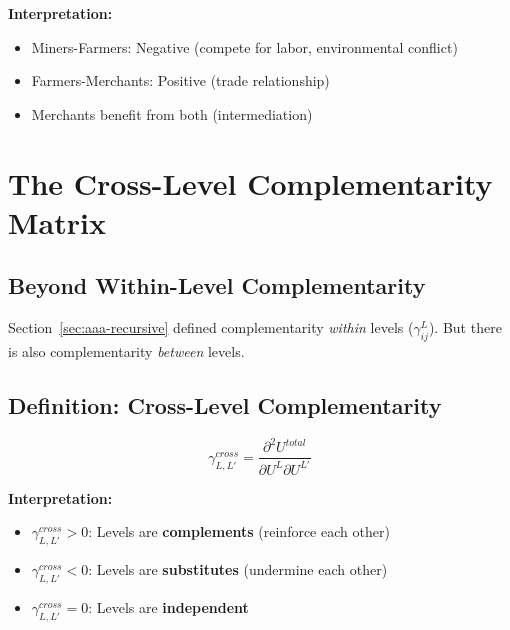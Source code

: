 \textbf{Interpretation:}
\begin{itemize}
\item Miners-Farmers: Negative (compete for labor, environmental conflict)
\item Farmers-Merchants: Positive (trade relationship)
\item Merchants benefit from both (intermediation)
\end{itemize}

\section{The Cross-Level Complementarity Matrix}
\label{sec:aaa-cross-level-gamma}

\subsection{Beyond Within-Level Complementarity}

Section~\ref{sec:aaa-recursive} defined complementarity \emph{within} levels ($\gamma^L_{ij}$).
But there is also complementarity \emph{between} levels.

\subsection{Definition: Cross-Level Complementarity}

\begin{tcolorbox}[colback=blue!5!white, colframe=blue!50!black, title=Definition: Cross-Level Complementarity]
\begin{equation}
\boxed{
\gamma^{cross}_{L,L'} = \frac{\partial^2 U^{total}}{\partial U^L \partial U^{L'}}
}
\end{equation}

\textbf{Interpretation:}
\begin{itemize}
\item $\gamma^{cross}_{L,L'} > 0$: Levels are \textbf{complements} (reinforce each other)
\item $\gamma^{cross}_{L,L'} < 0$: Levels are \textbf{substitutes} (undermine each other)
\item $\gamma^{cross}_{L,L'} = 0$: Levels are \textbf{independent}
\end{itemize}
\end{tcolorbox}

